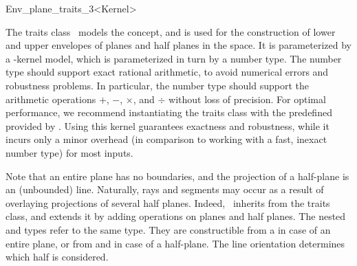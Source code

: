 
\ccRefPageBegin

\begin{ccRefClass}{Env_plane_traits_3<Kernel>}
    
\ccDefinition 

The traits class \ccRefName\ models the  concept,
and is used for the construction of lower and upper envelopes of planes
and half planes in the space. It is parameterized by a \cgal-kernel model,
which is parameterized in turn by a number type. The number type should 
support exact rational arithmetic, to avoid numerical errors and
robustness problems. In particular, the number type should support the 
arithmetic operations $+$, $-$, $\times$, and $\div$ without loss of 
precision. For optimal performance, we recommend instantiating the traits 
class with the predefined
 provided by \cgal.
Using this kernel guarantees exactness and robustness, while it incurs
only a minor overhead (in comparison to working with a fast, inexact number
type) for most inputs.

Note that an entire plane has no boundaries, and the projection of a 
half-plane is an (unbounded) line. Naturally, rays and segments may occur as
a result of overlaying projections of several half planes. Indeed,
\ccRefName\ inherits from the  traits
class, and extends it by adding operations on planes and half planes. 
The nested  and  types refer
to the same type. They are constructible from a  
in case of an entire plane, or from  and 
 in case of a half-plane. The line orientation 
determines which half is considered.

 
\ccIsModel

\ccInheritsFrom

\end{ccRefClass}

\ccRefPageEnd
